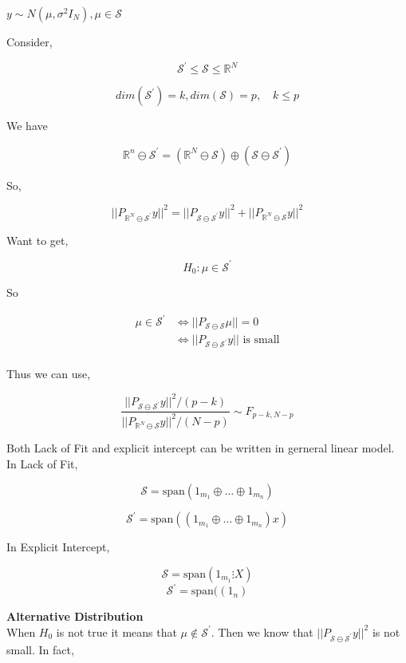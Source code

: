 \documentclass[11pt,fleqn]{book} %
\begin{document}
$y \sim N(\mu, \sigma^2 I_N), \mu \in \mathcal{S}$

Consider, 

$$\mathcal{S}^\prime \leq \mathcal{S} \leq \mathbb{R}^N$$


$$dim(\mathcal{S}^\prime) = k, dim(\mathcal{S}) = p, \quad k \leq p $$


We have 

$$ \mathbb{R}^n \ominus \mathcal{S}^\prime = (\mathbb{R}^N \ominus \mathcal{S}) \oplus (\mathcal{S \ominus \mathcal{S}^\prime}) $$

So,  

$$||P_{\mathbb{R}^N \ominus \mathcal{S}^\prime}y ||^2 = || P_{\mathcal{S} \ominus \mathcal{S}^\prime}y||^2 + ||P_{\mathbb{R}^N \ominus \mathcal{S}}y ||^2 $$

Want to get, 

$$H_0: \mu \in \mathcal{S}^\prime $$

So 

\begin{align*}
	\mu \in \mathcal{S}^\prime &\Leftrightarrow ||P_{\mathcal{S} \ominus \mathcal{S}}\mu || = 0\\
		&\Leftrightarrow ||P_{\mathcal{S} \ominus \mathcal{S}^\prime}y || \text{ is small}\\
\end{align*}

Thus we can use,

$$\frac{||P_{\mathcal{S} \ominus \mathcal{S}^\prime}y ||^2 / (p - k)}{||P_{\mathbb{R}^N \ominus \mathcal{S}}y ||^2 / (N-p)} \sim F_{p-k, N-p} $$

Both Lack of Fit and explicit intercept can be written in gerneral linear model.\\

In Lack of Fit, 

$$\mathcal{S} = \text{span}(1_{m_1} \oplus \dots \oplus  1_{m_n}) $$ 

$$\mathcal{S}^\prime = \text{span}((1_{m_1} \oplus \dots \oplus  1_{m_n}) x) $$

In Explicit Intercept, 

$$\mathcal{S} = \text{span}(1_{m_1} \vdots X) $$
$$\mathcal{S}^\prime = \text{span}((1_{n}) $$

\textbf{Alternative Distribution}\\

When $H_0$ is not true it means that $\mu \notin \mathcal{S}^\prime$. Then we know that $|| P_{\mathcal{S} \ominus \mathcal{S}^\prime}y||^2$ is not small. In fact, 
\end{document}
